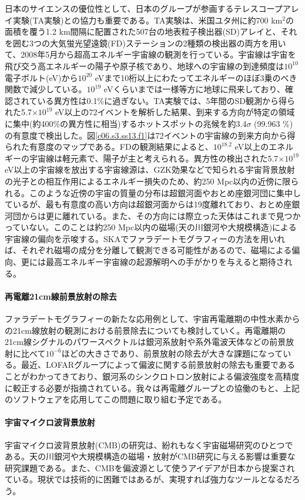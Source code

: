 日本のサイエンスの優位性として、日本のグループが参画するテレスコープアレイ実験(TA実験)との協力も重要である。TA実験は、米国ユタ州に約700 km$^2$の面積を覆う1.2 km間隔に配置された507台の地表粒子検出器(SD)アレイと、それを囲む3つの大気蛍光望遠鏡(FD)ステーションの2種類の検出器の両方を用いて、2008年5月から超高エネルギー宇宙線の観測を行っている。宇宙線は宇宙を飛び交う高エネルギーの陽子や原子核であり、地球への宇宙線の到達頻度は$10^{10}$電子ボルト(eV)から$10^{20}$ eVまで10桁以上にわたってエネルギーのほぼ3乗のべき関数で減少している。$10^{19}$ eVくらいまでは一様等方に地球に飛来しており、確認されている異方性は0.1\%に過ぎない。TA実験では、5年間のSD観測から得られた5.7$\times 10^{19}$ eV以上の72イベントを解析した結果、到来する方向が特定の領域に集中(約400\%の異方性に相当)するホットスポットの兆候を約3.4$\sigma$ (99.963 \%)の有意度で検出した\citep{2014ApJ...790L..21A}。図\ref{c06.s3.ss13.f1}は72イベントの宇宙線の到来方向から得られた有意度のマップである。FDの観測結果によると、$10^{18.2}$ eV以上のエネルギーの宇宙線は軽元素で、陽子が主と考えられる。異方性の検出された5.7$\times 10^{19}$ eV以上の宇宙線を放出する宇宙線源は、GZK効果などで知られる宇宙背景放射の光子との相互作用によるエネルギー損失のため、約250 Mpc以内の近傍に限られる。このような近傍の宇宙の質量の分布は超銀河面やおとめ座銀河団に集中しているが、最も有意度の高い方向は超銀河面からは19度離れており、おとめ座銀河団からは更に離れている。また、その方向には際立った天体はこれまで見つかっていない。このことは約250 Mpc以内の磁場(天の川銀河や大規模構造)による宇宙線の偏向を示唆する。SKAでファラデートモグラフィーの方法を用いれば、それぞれ磁場の成分を分離して観測できる可能性があるので、磁場による偏向、更には最高エネルギー宇宙線の起源解明への手がかりを与えると期待される。

\paragraph{再電離21cm線前景放射の除去}

ファラデートモグラフィーの新たな応用例として、宇宙再電離期の中性水素からの21cm線放射の観測における前景除去についても検討していく。再電離期の21cm線シグナルのパワースペクトルは銀河系放射や系外電波天体などの前景放射に比べて$10^{-6}$ほどの大きさであり、前景放射の除去が大きな課題になっている。最近、LOFARグループによって偏波に関する前景放射の除去も重要であることがわかってきており、銀河系のシンクロトロン放射による偏波強度を高精度に較正する必要が指摘されている。我々は再電離グループとの協働のもと、上記のソフトウェアを応用してこの問題に取り組む予定である。

\paragraph{宇宙マイクロ波背景放射}

宇宙マイクロ波背景放射(CMB)の研究は、紛れもなく宇宙磁場研究のひとつである。天の川銀河や大規模構造の磁場・放射がCMB研究に与える影響は重要な研究課題である。また、CMBを偏波源として使うアイデアが日本から提案されている\citep{2003ApJ...584..599O}。現状では技術的に困難ではあるが、実現すれば強力なツールとなるだろう。





